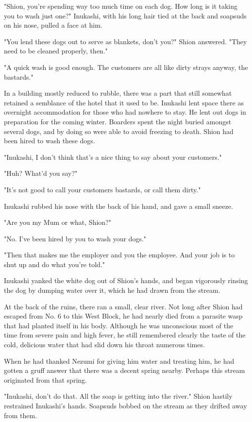"Shion, you're spending way too much time on each dog. How long is it
taking you to wash just one?" Inukashi, with his long hair tied at the
back and soapsuds on his nose, pulled a face at him.

"You lend these dogs out to serve as blankets, don't you?" Shion
answered. "They need to be cleaned properly, then."

"A quick wash is good enough. The customers are all like dirty strays
anyway, the bastards."

In a building mostly reduced to rubble, there was a part that still
somewhat retained a semblance of the hotel that it used to be. Inukashi
lent space there as overnight accommodation for those who had nowhere to
stay. He lent out dogs in preparation for the coming winter. Boarders
spent the night buried amongst several dogs, and by doing so were able
to avoid freezing to death. Shion had been hired to wash these dogs.

"Inukashi, I don't think that's a nice thing to say about your
customers."

"Huh? What'd you say?"

"It's not good to call your customers bastards, or call them dirty."

Inukashi rubbed his nose with the back of his hand, and gave a small
sneeze.

"Are you my Mum or what, Shion?"

"No. I've been hired by you to wash your dogs."

"Then that makes me the employer and you the employee. And your job is
to shut up and do what you're told."

Inukashi yanked the white dog out of Shion's hands, and began vigorously
rinsing the dog by dumping water over it, which he had drawn from the
stream.

At the back of the ruins, there ran a small, clear river. Not long after
Shion had escaped from No. 6 to this West Block, he had nearly died from
a parasite wasp that had planted itself in his body. Although he was
unconscious most of the time from severe pain and high fever, he still
remembered clearly the taste of the cold, delicious water that had slid
down his throat numerous times.

When he had thanked Nezumi for giving him water and treating him, he had
gotten a gruff answer that there was a decent spring nearby. Perhaps
this stream originated from that spring.

"Inukashi, don't do that. All the soap is getting into the river." Shion
hastily restrained Inukashi's hands. Soapsuds bobbed on the stream as
they drifted away from them.

